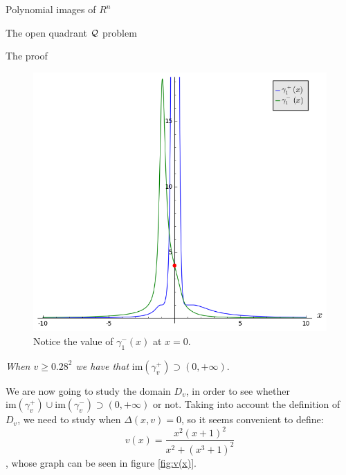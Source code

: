 \documentclass[11pt, a4paper, english, twoside, notitlepage]{report}
\begin{document}
\begin{chapter}{Polynomial images of $R^n$}
\begin{section}{The open quadrant $\mathcal{Q}$ problem}
\begin{subsection}{The proof}
\begin{Proof}
			\begin{figure}[h]
				\centering
				\includegraphics[width=1\textwidth]{plots/ch1_09_limit.png}
				\caption{Notice the value of $\gamma_1^-(x)$ at $x = 0$.\label{fig:limit}}
			\end{figure}

			\begin{center}
				 \emph{When $v \geq 0.28^2$ we have that} $\text{im}(\gamma_v^+) \supset (0, +\infty)$.
			\end{center}\label{step3}
			
			We are now going to study the domain $D_v$, in order to see whether $ \text{im}(\gamma_v^+) \cup \text{im}(\gamma_v^-) \supset (0, +\infty)$ or not. Taking into account the definition of $D_v$, we need to study when $\Delta(x, v) = 0$, so it seems convenient to define:
			$$v(x)=\frac{x^2(x+1)^2}{x^2+(x^3+1)^2}$$, whose graph can be seen in figure \ref{fig:v(x)}.
			

\end{Proof}
\end{subsection}
\end{section}
\end{chapter}
\end{document}
